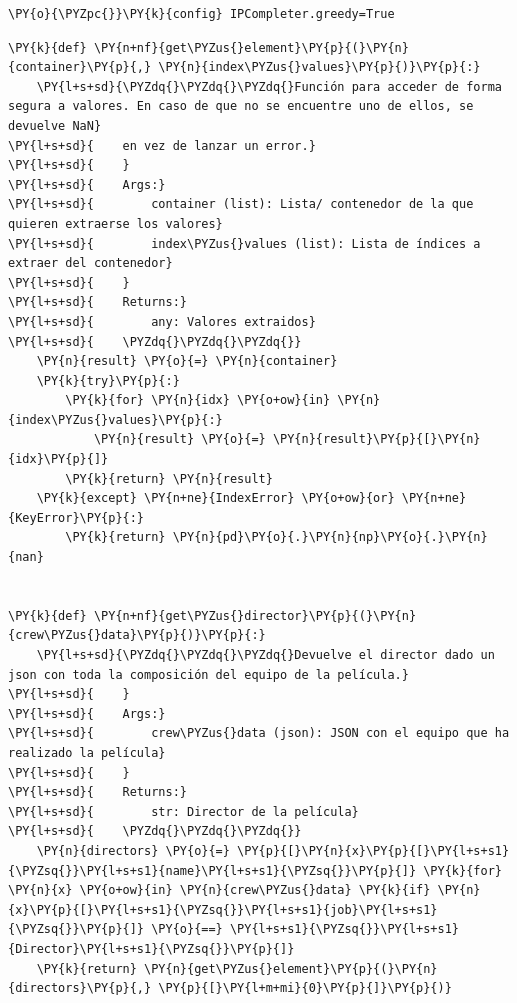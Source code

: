     \begin{tcolorbox}[breakable, size=fbox, boxrule=1pt, pad at break*=1mm,colback=cellbackground, colframe=cellborder]
\begin{Verbatim}[commandchars=\\\{\}]
\PY{o}{\PYZpc{}}\PY{k}{config} IPCompleter.greedy=True
\end{Verbatim}
\end{tcolorbox}

    \begin{tcolorbox}[breakable, size=fbox, boxrule=1pt, pad at break*=1mm,colback=cellbackground, colframe=cellborder]
\begin{Verbatim}[commandchars=\\\{\}]
\PY{k}{def} \PY{n+nf}{get\PYZus{}element}\PY{p}{(}\PY{n}{container}\PY{p}{,} \PY{n}{index\PYZus{}values}\PY{p}{)}\PY{p}{:}
    \PY{l+s+sd}{\PYZdq{}\PYZdq{}\PYZdq{}Función para acceder de forma segura a valores. En caso de que no se encuentre uno de ellos, se devuelve NaN}
\PY{l+s+sd}{    en vez de lanzar un error.}
\PY{l+s+sd}{    }
\PY{l+s+sd}{    Args:}
\PY{l+s+sd}{        container (list): Lista/ contenedor de la que quieren extraerse los valores}
\PY{l+s+sd}{        index\PYZus{}values (list): Lista de índices a extraer del contenedor}
\PY{l+s+sd}{    }
\PY{l+s+sd}{    Returns:}
\PY{l+s+sd}{        any: Valores extraidos}
\PY{l+s+sd}{    \PYZdq{}\PYZdq{}\PYZdq{}}
    \PY{n}{result} \PY{o}{=} \PY{n}{container}
    \PY{k}{try}\PY{p}{:}
        \PY{k}{for} \PY{n}{idx} \PY{o+ow}{in} \PY{n}{index\PYZus{}values}\PY{p}{:}
            \PY{n}{result} \PY{o}{=} \PY{n}{result}\PY{p}{[}\PY{n}{idx}\PY{p}{]}
        \PY{k}{return} \PY{n}{result}
    \PY{k}{except} \PY{n+ne}{IndexError} \PY{o+ow}{or} \PY{n+ne}{KeyError}\PY{p}{:}
        \PY{k}{return} \PY{n}{pd}\PY{o}{.}\PY{n}{np}\PY{o}{.}\PY{n}{nan}


\PY{k}{def} \PY{n+nf}{get\PYZus{}director}\PY{p}{(}\PY{n}{crew\PYZus{}data}\PY{p}{)}\PY{p}{:}
    \PY{l+s+sd}{\PYZdq{}\PYZdq{}\PYZdq{}Devuelve el director dado un json con toda la composición del equipo de la película.}
\PY{l+s+sd}{    }
\PY{l+s+sd}{    Args:}
\PY{l+s+sd}{        crew\PYZus{}data (json): JSON con el equipo que ha realizado la película}
\PY{l+s+sd}{    }
\PY{l+s+sd}{    Returns:}
\PY{l+s+sd}{        str: Director de la película}
\PY{l+s+sd}{    \PYZdq{}\PYZdq{}\PYZdq{}}
    \PY{n}{directors} \PY{o}{=} \PY{p}{[}\PY{n}{x}\PY{p}{[}\PY{l+s+s1}{\PYZsq{}}\PY{l+s+s1}{name}\PY{l+s+s1}{\PYZsq{}}\PY{p}{]} \PY{k}{for} \PY{n}{x} \PY{o+ow}{in} \PY{n}{crew\PYZus{}data} \PY{k}{if} \PY{n}{x}\PY{p}{[}\PY{l+s+s1}{\PYZsq{}}\PY{l+s+s1}{job}\PY{l+s+s1}{\PYZsq{}}\PY{p}{]} \PY{o}{==} \PY{l+s+s1}{\PYZsq{}}\PY{l+s+s1}{Director}\PY{l+s+s1}{\PYZsq{}}\PY{p}{]}
    \PY{k}{return} \PY{n}{get\PYZus{}element}\PY{p}{(}\PY{n}{directors}\PY{p}{,} \PY{p}{[}\PY{l+m+mi}{0}\PY{p}{]}\PY{p}{)}



\end{Verbatim}
\end{tcolorbox}
